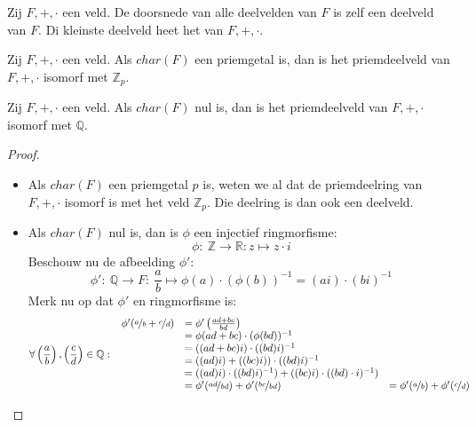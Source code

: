 \documentclass[main.tex]{subfiles}
\begin{document}
\begin{de}
  Zij $F,+,\cdot$ een veld.
  De doorsnede van alle deelvelden van $F$ is zelf een deelveld van $F$.
  Di kleinste deelveld heet het  van $F,+,\cdot$.
\end{de}

\begin{st}
  \label{st:char-priem-priemdeelveld-zp}
  Zij $F,+,\cdot$ een veld.
  Als $char(F)$ een priemgetal is, dan is het priemdeelveld van $F,+,\cdot$ isomorf met $\mathbb{Z}_{p}$.
\end{st}

\begin{st}
  Zij $F,+,\cdot$ een veld.
  Als $char(F)$ nul is, dan is het priemdeelveld van $F,+,\cdot$ isomorf met $\mathbb{Q}$.

  \begin{proof}
    \begin{itemize}
    \item Als $char(F)$ een priemgetal $p$ is, weten we al dat de priemdeelring van $F,+,\cdot$ isomorf is met het veld $\mathbb{Z}_{p}$.
      Die deelring is dan ook een deelveld.
    \item Als $char(F)$ nul is, dan is $\phi$ een injectief ringmorfisme:
      \[ \phi:\ \mathbb{Z} \rightarrow \mathbb{R}: z \mapsto z\cdot i \]
      Beschouw nu de afbeelding $\phi'$:
      \[ \phi':\ \mathbb{Q} \rightarrow F:\ \frac{a}{b} \mapsto \phi(a) \cdot (\phi(b))^{-1} = (ai) \cdot (bi)^{-1} \]
      Merk nu op dat $\phi'$ en ringmorfisme is:
      \[
      \forall \left(\frac{a}{b}\right),\left(\frac{c}{d}\right) \in
      \mathbb{Q}:\
      \begin{array}{rll}
        \phi'(\nicefrac{a}{b} + \nicefrac{c}{d}) &=  \phi'\left(\frac{ad+bc}{bd}\right) &\\
                                                 &= \phi(ad+bc) \cdot (\phi(bd))^{-1} &\\
                                                 &= ((ad+bc)i) \cdot ((bd)i)^{-1} &\\
                                                 &= ((ad)i) + ((bc)i)) \cdot ((bd)i)^{-1} &\\
                                                 &= ((ad)i)\cdot ((bd)i)^{-1}) +  ((bc)i) \cdot ((bd)\cdot i)^{-1}) &\\
                                                 &= \phi'(\nicefrac{ad}{bd}) + \phi'(\nicefrac{bc}{bd}) &= \phi'(\nicefrac{a}{b}) + \phi'(\nicefrac{c}{d}) \\

\end{array}\]
\end{itemize}
\end{proof}
\end{st}
\end{document}
